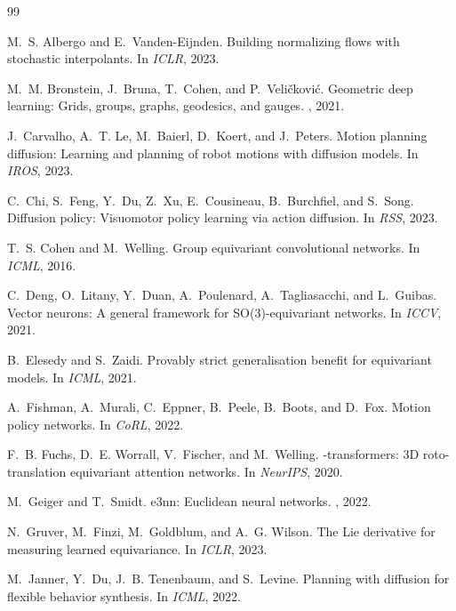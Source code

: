 \documentclass[10pt,twocolumn,letterpaper]{article}
\begin{document}
\small
\begin{thebibliography}{99}

M.~S. Albergo and E.~Vanden-Eijnden.
\newblock Building normalizing flows with stochastic interpolants.
\newblock In {\em ICLR}, 2023.

M.~M. Bronstein, J.~Bruna, T.~Cohen, and P.~Veli\v{c}kovi\'{c}.
\newblock Geometric deep learning: Grids, groups, graphs, geodesics, and gauges.
, 2021.

J.~Carvalho, A.~T. Le, M.~Baierl, D.~Koert, and J.~Peters.
\newblock Motion planning diffusion: Learning and planning of robot motions with
  diffusion models.
\newblock In {\em IROS}, 2023.

C.~Chi, S.~Feng, Y.~Du, Z.~Xu, E.~Cousineau, B.~Burchfiel, and S.~Song.
\newblock Diffusion policy: Visuomotor policy learning via action diffusion.
\newblock In {\em RSS}, 2023.

T.~S. Cohen and M.~Welling.
\newblock Group equivariant convolutional networks.
\newblock In {\em ICML}, 2016.

C.~Deng, O.~Litany, Y.~Duan, A.~Poulenard, A.~Tagliasacchi, and L.~Guibas.
\newblock Vector neurons: A general framework for {SO(3)}-equivariant networks.
\newblock In {\em ICCV}, 2021.

B.~Elesedy and S.~Zaidi.
\newblock Provably strict generalisation benefit for equivariant models.
\newblock In {\em ICML}, 2021.

A.~Fishman, A.~Murali, C.~Eppner, B.~Peele, B.~Boots, and D.~Fox.
\newblock Motion policy networks.
\newblock In {\em CoRL}, 2022.

F.~B. Fuchs, D.~E. Worrall, V.~Fischer, and M.~Welling.
-transformers: 3{D} roto-translation equivariant attention
  networks.
\newblock In {\em NeurIPS}, 2020.

M.~Geiger and T.~Smidt.
\newblock e3nn: Euclidean neural networks.
, 2022.

N.~Gruver, M.~Finzi, M.~Goldblum, and A.~G. Wilson.
\newblock The {L}ie derivative for measuring learned equivariance.
\newblock In {\em ICLR}, 2023.

M.~Janner, Y.~Du, J.~B. Tenenbaum, and S.~Levine.
\newblock Planning with diffusion for flexible behavior synthesis.
\newblock In {\em ICML}, 2022.


\end{thebibliography}
\end{document}
